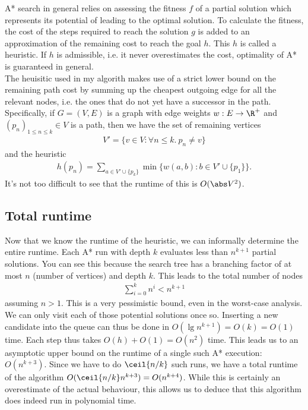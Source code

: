\documentclass{article}
\begin{document}
A* search in general relies on assessing the fitness $f$ of a partial solution 
which represents its potential of leading to the optimal solution. To calculate the
fitness, the cost of the steps required to reach the solution $g$ is added to an approximation
of the remaining cost to reach the goal $h$. This $h$ is called a heuristic.
If $h$ is admissible, i.e. it never overestimates the cost, optimality of A* is
guaranteed in general.\\
The heuisitic used in my algorith makes use of a strict lower bound on the remaining
path cost by summing up the cheapest outgoing edge for all the relevant nodes, i.e.
the ones that do not yet have a successor in the path. Specifically, if $G=(V,E)$ is
a graph with edge weights $w:E\to\R^+$
 and $(p_n)_{1\leq n\leq k}\in V$ is a path, then we have the set of remaining vertices
\begin{align*}
    V'=\{v\in V : \forall n \leq k.\: p_n \not= v\}
\end{align*}
and the heuristic
\begin{align*}
    h(p_n) = \sum_{a\in V'\cup\{p_k\}} \min\{w(a, b) : b\in V'\cup\{p_1\}\}.
\end{align*}
It's not too difficult to see that the runtime of this is $O(\abs V^2)$. 

\subsection{Total runtime}

Now that we know the runtime of the heuristic, we can informally determine the entire
runtime. Each A* run with depth $k$ evaluates less than $n^{k+1}$ partial solutions. 
You can see this because the search tree has a branching factor of at most $n$ (number
of vertices) and depth $k$. This leads to the total number of nodes
\begin{align*}
    \sum_{i=0}^k n^i < n^{k+1}
\end{align*}
assuming $n>1$. This is a very pessimistic bound, even in the worst-case
analysis. We can only visit each of those potential solutions once so.
Inserting a new candidate into the queue can thus be done in $O(\lg n^{k+1})
= O(k)=O(1)$ time. Each step thus takes $O(h)+O(1)=O(n^2)$ time.
This leads us to an asymptotic upper bound on the runtime of a single
such A* execution: $O(n^{k+3})$. Since we have to do $\ceil{n/k}$ such
runs, we have a total runtime of the algorithm $O(\ceil{n/k}n^{k+3})=
O(n^{k+4})$. While this is certainly an overestimate of the actual behaviour,
this allows us to deduce that this algorithm does indeed run in
polynomial time.
\end{document}

